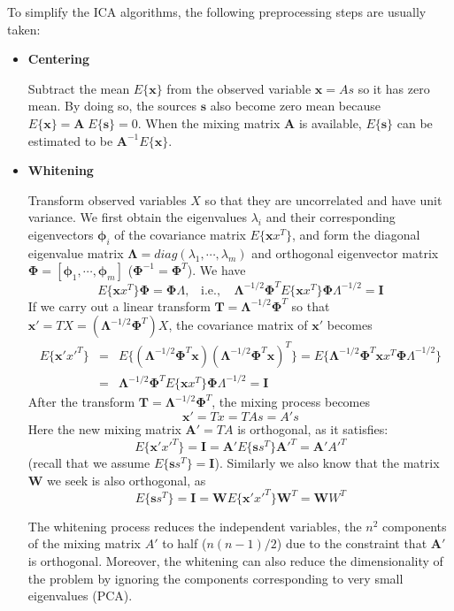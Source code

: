 \documentclass[12pt, a4paper, onecolumn]{IEEEtran}
\begin{document}
To simplify the ICA algorithms, the following preprocessing steps are usually
taken:
\begin{itemize}
\item {\bf Centering}

Subtract the mean $E\{{\mathbf x}\}$ from the observed variable ${\mathbf x=As}$
so it has zero mean. By doing so, the sources ${\mathbf s}$ also become zero
mean because $E\{{\mathbf x}\}={\mathbf A}\;E\{{\mathbf s}\}=0$. When the
mixing matrix ${\mathbf A}$ is available, $E\{{\mathbf s}\}$ can be estimated
to be ${\mathbf A}^{-1}E\{{\mathbf x}\}$.

\item {\bf Whitening}

Transform observed variables $X$ so that they are uncorrelated and have unit
variance. We first obtain the eigenvalues $\lambda_i$ and their corresponding
eigenvectors ${\mathbf \phi}_i$ of the covariance matrix $E\{{\mathbf xx}^T\}$,
and form the diagonal eigenvalue matrix ${\mathbf \Lambda}=diag(\lambda_1,
\cdots,\lambda_m)$ and orthogonal eigenvector matrix ${\mathbf \Phi}=
[{\mathbf \phi}_1,\cdots,{\mathbf \phi}_m]$ (${\mathbf \Phi}^{-1}={\mathbf \Phi}^T$).
We have
\[	E\{{\mathbf xx}^T\}{\mathbf \Phi}={\mathbf \Phi\Lambda},
	\;\;\;\mbox{i.e.,}\;\;\;\;
	{\mathbf \Lambda}^{-1/2}{\mathbf \Phi}^T E\{{\mathbf xx}^T\}
	{\mathbf \Phi \Lambda^{-1/2}}={\mathbf I}	\]
If we carry out a linear transform ${\mathbf T}={\mathbf \Lambda}^{-1/2}
{\mathbf \Phi}^T$ so that ${\mathbf x'=TX}=({\mathbf \Lambda}^{-1/2}{\mathbf \Phi}^T) X$, the covariance matrix of ${\mathbf x}'$ becomes
\begin{eqnarray}
E\{{\mathbf x'x'}^T\}&=&E\{({\mathbf \Lambda}^{-1/2}{\mathbf \Phi}^T {\mathbf x})
	({\mathbf \Lambda}^{-1/2}{\mathbf \Phi}^T {\mathbf x})^T\}
	=E\{{\mathbf \Lambda}^{-1/2}{\mathbf \Phi}^T {\mathbf xx}^T
	{\mathbf \Phi \Lambda}^{-1/2}\}
	\nonumber \\
	&=&{\mathbf \Lambda}^{-1/2}{\mathbf \Phi}^T E\{{\mathbf xx}^T\}
	{\mathbf \Phi \Lambda}^{-1/2}={\mathbf I }
	\nonumber
\end{eqnarray}
After the transform ${\mathbf T}={\mathbf \Lambda}^{-1/2}{\mathbf \Phi}^T$,
the mixing process becomes
\[	{\mathbf x'=Tx=TAs=A's}	\]
Here the new mixing matrix ${\mathbf A'=TA}$ is orthogonal, as it satisfies:
\[	E\{{\mathbf x'x'}^T\}={\mathbf I}={\mathbf A}'E\{{\mathbf ss}^T\}
	{\mathbf A'}^T={\mathbf A'A'}^T	\]
(recall that we assume $E\{{\mathbf ss}^T\}={\mathbf I}$). Similarly we also
know that the matrix ${\mathbf W}$ we seek is also orthogonal, as
\[	E\{{\mathbf ss}^T\}={\mathbf I}={\mathbf W}E\{{\mathbf x'x'}^T\}
	{\mathbf W}^T={\mathbf WW}^T	\]

The whitening process reduces the independent variables, the $n^2$ components
of the mixing matrix $A'$ to half ($n(n-1)/2$) due to the constraint that
${\mathbf A}'$ is orthogonal. Moreover, the whitening can also reduce the
dimensionality of the problem by ignoring the components corresponding to
very small eigenvalues (PCA).

\end{itemize}
\end{document}
